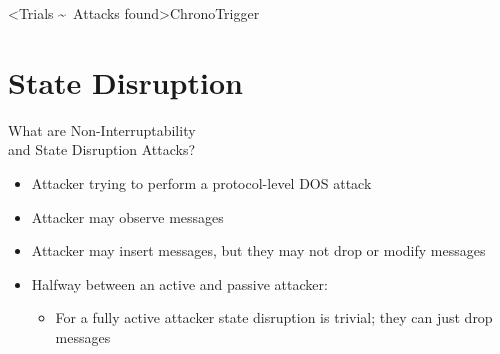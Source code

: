\interlude[2]<Trials \textasciitilde\ Attacks found>{ChronoTrigger}
\hypertarget{state-disruption}{%
\section{State Disruption}\label{state-disruption}}




\begin{frame}{What are Non-Interruptability\\and State Disruption Attacks?}
  \begin{itemize}
    \item Attacker trying to perform a protocol-level DOS attack
    \item Attacker may observe messages
    \item Attacker may insert messages, but they may not drop or modify messages
    \item Halfway between an active and passive attacker:
    \begin{itemize}
    \item For a fully active attacker state disruption is trivial; they can just drop messages
    \end{itemize}
  \end{itemize}
\end{frame}




